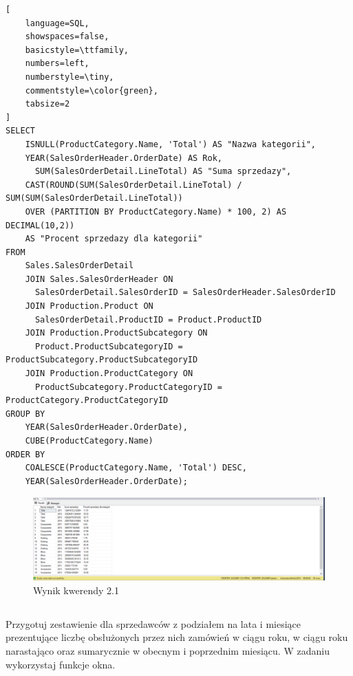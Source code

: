 \documentclass[a4paper,12pt]{article}
\begin{document}
{\small
\begin{lstlisting}[
	language=SQL,
	showspaces=false,
	basicstyle=\ttfamily,
	numbers=left,
	numberstyle=\tiny,
	commentstyle=\color{green},
	tabsize=2
]
SELECT 
    ISNULL(ProductCategory.Name, 'Total') AS "Nazwa kategorii",
    YEAR(SalesOrderHeader.OrderDate) AS Rok,
	  SUM(SalesOrderDetail.LineTotal) AS "Suma sprzedazy",
    CAST(ROUND(SUM(SalesOrderDetail.LineTotal) / SUM(SUM(SalesOrderDetail.LineTotal)) 
    OVER (PARTITION BY ProductCategory.Name) * 100, 2) AS DECIMAL(10,2)) 
    AS "Procent sprzedazy dla kategorii"
FROM 
    Sales.SalesOrderDetail
    JOIN Sales.SalesOrderHeader ON 
      SalesOrderDetail.SalesOrderID = SalesOrderHeader.SalesOrderID
    JOIN Production.Product ON 
      SalesOrderDetail.ProductID = Product.ProductID
    JOIN Production.ProductSubcategory ON 
      Product.ProductSubcategoryID = ProductSubcategory.ProductSubcategoryID
    JOIN Production.ProductCategory ON 
      ProductSubcategory.ProductCategoryID = ProductCategory.ProductCategoryID
GROUP BY 
    YEAR(SalesOrderHeader.OrderDate),
    CUBE(ProductCategory.Name)
ORDER BY 
    COALESCE(ProductCategory.Name, 'Total') DESC,
    YEAR(SalesOrderHeader.OrderDate);
\end{lstlisting}}

\begin{figure}[H]
  \centering
  \includegraphics[width=1.0\textwidth]{images/2.1.png}
  \caption{Wynik kwerendy 2.1}
\end{figure}

\subsection{}

Przygotuj zestawienie dla sprzedawców z podziałem na lata i miesiące prezentujące
liczbę obsłużonych przez nich zamówień w ciągu roku, w ciągu roku narastająco oraz
sumarycznie w obecnym i poprzednim miesiącu. W zadaniu wykorzystaj funkcje okna.
\end{document}
